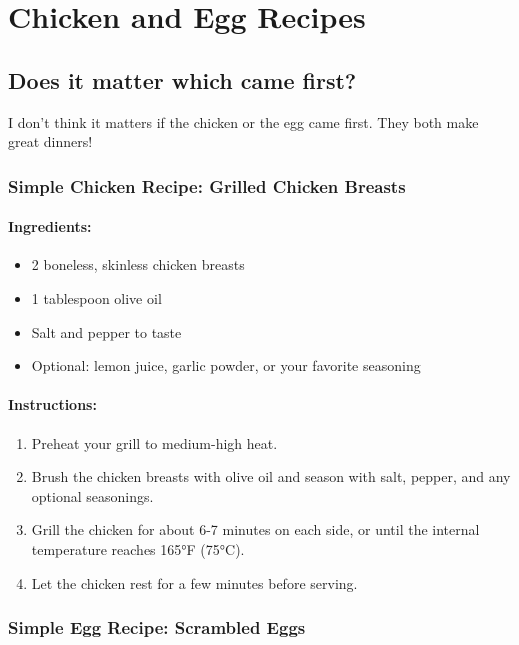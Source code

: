 \section{Chicken and Egg Recipes}

\subsection{Does it matter which came first?}

I don't think it matters if the chicken or the egg came first.
They both make great dinners! 🍗

\subsubsection{Simple Chicken Recipe: Grilled Chicken Breasts}

\paragraph{Ingredients:}

\begin{itemize}
\item 2 boneless, skinless chicken breasts
\item 1 tablespoon olive oil
\item Salt and pepper to taste
\item Optional: lemon juice, garlic powder, or your favorite seasoning
\end{itemize}

\paragraph{Instructions:}

\begin{enumerate}
\item Preheat your grill to medium-high heat.
\item Brush the chicken breasts with olive oil and season with salt, pepper, and any optional seasonings.
\item Grill the chicken for about 6-7 minutes on each side, or until the internal temperature reaches 165°F (75°C).
\item Let the chicken rest for a few minutes before serving.
\end{enumerate}

\subsubsection{Simple Egg Recipe: Scrambled Eggs}

